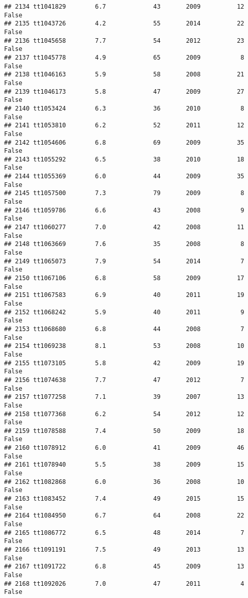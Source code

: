 \documentclass[
]{article}
\begin{document}
\begin{verbatim}
## 2134 tt1041829        6.7             43       2009          12   False
## 2135 tt1043726        4.2             55       2014          22   False
## 2136 tt1045658        7.7             54       2012          23   False
## 2137 tt1045778        4.9             65       2009           8   False
## 2138 tt1046163        5.9             58       2008          21   False
## 2139 tt1046173        5.8             47       2009          27   False
## 2140 tt1053424        6.3             36       2010           8   False
## 2141 tt1053810        6.2             52       2011          12   False
## 2142 tt1054606        6.8             69       2009          35   False
## 2143 tt1055292        6.5             38       2010          18   False
## 2144 tt1055369        6.0             44       2009          35   False
## 2145 tt1057500        7.3             79       2009           8   False
## 2146 tt1059786        6.6             43       2008           9   False
## 2147 tt1060277        7.0             42       2008          11   False
## 2148 tt1063669        7.6             35       2008           8   False
## 2149 tt1065073        7.9             54       2014           7   False
## 2150 tt1067106        6.8             58       2009          17   False
## 2151 tt1067583        6.9             40       2011          19   False
## 2152 tt1068242        5.9             40       2011           9   False
## 2153 tt1068680        6.8             44       2008           7   False
## 2154 tt1069238        8.1             53       2008          10   False
## 2155 tt1073105        5.8             42       2009          19   False
## 2156 tt1074638        7.7             47       2012           7   False
## 2157 tt1077258        7.1             39       2007          13   False
## 2158 tt1077368        6.2             54       2012          12   False
## 2159 tt1078588        7.4             50       2009          18   False
## 2160 tt1078912        6.0             41       2009          46   False
## 2161 tt1078940        5.5             38       2009          15   False
## 2162 tt1082868        6.0             36       2008          10   False
## 2163 tt1083452        7.4             49       2015          15   False
## 2164 tt1084950        6.7             64       2008          22   False
## 2165 tt1086772        6.5             48       2014           7   False
## 2166 tt1091191        7.5             49       2013          13   False
## 2167 tt1091722        6.8             45       2009          13   False
## 2168 tt1092026        7.0             47       2011           4   False

\end{verbatim}
\end{document}
